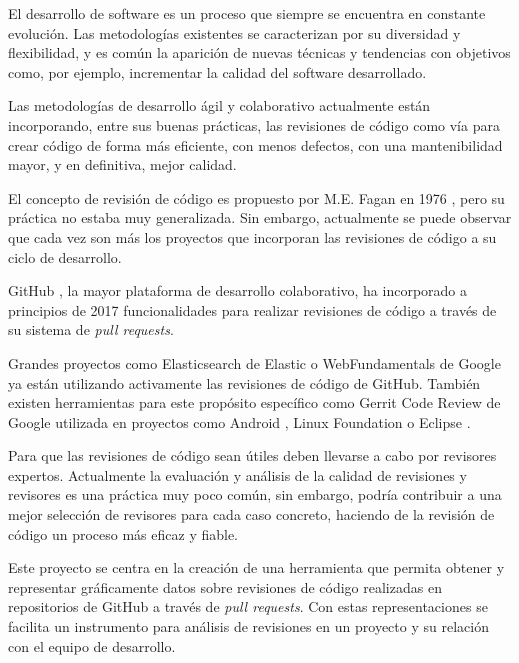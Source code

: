 
El desarrollo de software es un proceso que siempre se encuentra en constante evolución. Las metodologías existentes se caracterizan por su diversidad y flexibilidad, y es común la aparición de nuevas técnicas y tendencias con objetivos como, por ejemplo, incrementar la calidad del software desarrollado.

Las metodologías de desarrollo ágil y colaborativo actualmente están incorporando, entre sus buenas prácticas, las revisiones de código como vía para crear código de forma más eficiente, con menos defectos, con una mantenibilidad mayor, y en definitiva, mejor calidad.

El concepto de revisión de código es propuesto por M.E. Fagan en 1976 \cite{5388086}, pero su práctica no estaba muy generalizada. Sin embargo, actualmente se puede observar que cada vez son más los proyectos que incorporan las revisiones de código a su ciclo de desarrollo.

GitHub \cite{github:home}, la mayor plataforma de desarrollo colaborativo, ha incorporado a principios de 2017 funcionalidades para realizar revisiones de código a través de su sistema de \textit{pull requests}.

Grandes proyectos como Elasticsearch \cite{elastic:elasticsearch} de Elastic o WebFundamentals \cite{google:webfundamentals} de Google ya están utilizando activamente las revisiones de código de GitHub. También existen herramientas para este propósito específico como Gerrit Code Review \cite{gerrit:home} de Google utilizada en proyectos como Android \cite{android:home}, Linux Foundation \cite{linuxfoundation:home} o Eclipse \cite{eclipse:home}.

Para que las revisiones de código sean útiles deben llevarse a cabo por revisores expertos. Actualmente la evaluación y análisis de la calidad de revisiones y revisores es una práctica muy poco común, sin embargo, podría contribuir a una mejor selección de revisores para cada caso concreto, haciendo de la revisión de código un proceso más eficaz y fiable.


Este proyecto se centra en la creación de una herramienta que permita obtener y representar gráficamente datos sobre revisiones de código realizadas en repositorios de GitHub a través de \textit{pull requests}. Con estas representaciones se facilita un instrumento para análisis de revisiones en un proyecto y su relación con el equipo de desarrollo.


